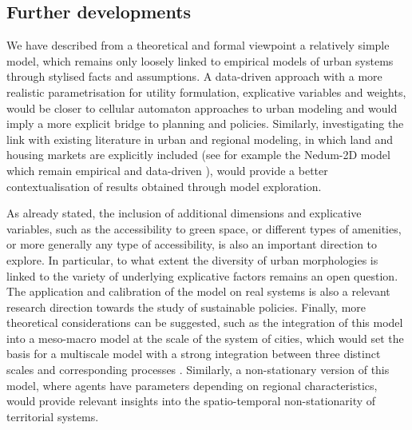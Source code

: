 \documentclass[letterpaper]{article}
\begin{document}
\subsection{Further developments}




We have described from a theoretical and formal viewpoint a relatively simple model, which remains only loosely linked to empirical models of urban systems through stylised facts and assumptions. A data-driven approach with a more realistic parametrisation for utility formulation, explicative variables and weights, would be closer to cellular automaton approaches to urban modeling \citep{clarke2007decade} and would imply a more explicit bridge to planning and policies. Similarly, investigating the link with existing literature in urban and regional modeling, in which land and housing markets are explicitly included (see for example the Nedum-2D model which remain empirical and data-driven \citep{viguie2012trade}), would provide a better contextualisation of results obtained through model exploration.

As already stated, the inclusion of additional dimensions and explicative variables, such as the accessibility to green space, or different types of amenities, or more generally any type of accessibility, is also an important direction to explore. In particular, to what extent the diversity of urban morphologies is linked to the variety of underlying explicative factors remains an open question. The application and calibration of the model on real systems is also a relevant research direction towards the study of sustainable policies. Finally, more theoretical considerations can be suggested, such as the integration of this model into a meso-macro model at the scale of the system of cities, which would set the basis for a multiscale model with a strong integration between three distinct scales and corresponding processes \citep{rozenblat2018conclusion}. Similarly, a non-stationary version of this model, where agents have parameters depending on regional characteristics, would provide relevant insights into the spatio-temporal non-stationarity of territorial systems.
\end{document}
